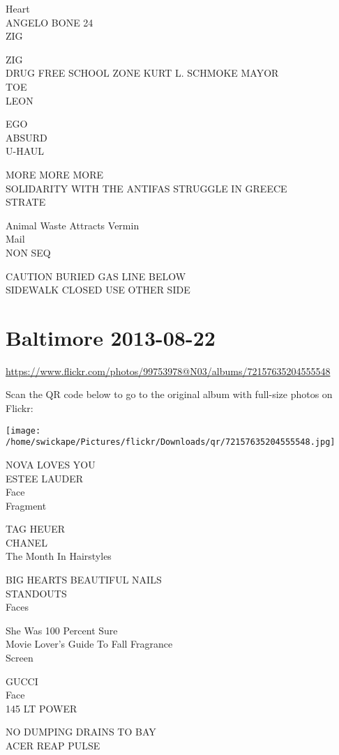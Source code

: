 \documentclass[10pt,letterpaper]{article}
\begin{document}
Heart\\
ANGELO BONE 24\\
ZIG

ZIG\\
DRUG FREE SCHOOL ZONE KURT L. SCHMOKE MAYOR\\
TOE\\
LEON

EGO\\
ABSURD\\
U{-}HAUL

MORE MORE MORE\\
SOLIDARITY WITH THE ANTIFAS STRUGGLE IN GREECE\\
STRATE

Animal Waste Attracts Vermin\\
Mail\\
NON SEQ

CAUTION BURIED GAS LINE BELOW\\
SIDEWALK CLOSED USE OTHER SIDE
\pagebreak

\section*{Baltimore 2013-08-22}

\url{https://www.flickr.com/photos/99753978@N03/albums/72157635204555548}

Scan the QR code below to go to the original album with full-size photos on Flickr:

\texttt{[image: /home/swickape/Pictures/flickr/Downloads/qr/72157635204555548.jpg]}
\pagebreak

NOVA LOVES YOU\\
ESTEE LAUDER\\
Face\\
Fragment

TAG HEUER\\
CHANEL\\
The Month In Hairstyles

BIG HEARTS BEAUTIFUL NAILS\\
STANDOUTS\\
Faces

She Was 100 Percent Sure\\
Movie Lover's Guide To Fall Fragrance\\
Screen

GUCCI\\
Face\\
145 LT POWER

NO DUMPING DRAINS TO BAY\\
ACER REAP PULSE
\end{document}
